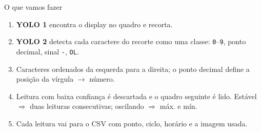 \documentclass[aspectratio=169,10pt]{beamer}
\begin{document}
\begin{frame}{O que vamos fazer}
  \centering
  \vspace{3mm}
  \begin{enumerate}\small
    \item \textbf{YOLO 1} encontra o display no quadro e recorta.
    \item \textbf{YOLO 2} detecta cada caractere do recorte como uma classe:
          \texttt{0}--\texttt{9}, ponto decimal, sinal \texttt{-}, \texttt{OL}.
    \item Caracteres ordenados da esquerda para a direita; o ponto decimal
          define a posição da vírgula $\rightarrow$ número.
    \item Leitura com baixa confiança é descartada e o quadro seguinte é lido.
          Estável $\Rightarrow$ duas leituras consecutivas; oscilando $\Rightarrow$ máx. e mín.
    \item Cada leitura vai para o CSV com ponto, ciclo, horário e a imagem usada.
  \end{enumerate}
\end{frame}
\end{document}
